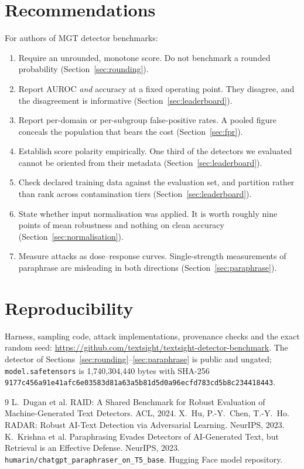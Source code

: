 \documentclass[11pt]{article}
\begin{document}
\section{Recommendations}

For authors of MGT detector benchmarks:
\begin{enumerate}\itemsep0pt
\item Require an unrounded, monotone score. Do not benchmark a rounded
probability (Section~\ref{sec:rounding}).
\item Report AUROC \emph{and} accuracy at a fixed operating point. They disagree,
and the disagreement is informative (Section~\ref{sec:leaderboard}).
\item Report per-domain or per-subgroup false-positive rates. A pooled figure
conceals the population that bears the cost (Section~\ref{sec:fpr}).
\item Establish score polarity empirically. One third of the detectors we
evaluated cannot be oriented from their metadata (Section~\ref{sec:leaderboard}).
\item Check declared training data against the evaluation set, and partition
rather than rank across contamination tiers (Section~\ref{sec:leaderboard}).
\item State whether input normalisation was applied. It is worth roughly nine
points of mean robustness and nothing on clean accuracy
(Section~\ref{sec:normalisation}).
\item Measure attacks as dose--response curves. Single-strength measurements of
paraphrase are misleading in both directions (Section~\ref{sec:paraphrase}).
\end{enumerate}

\section*{Reproducibility}

Harness, sampling code, attack implementations, provenance checks and the exact
random seed: \url{https://github.com/textsight/textsight-detector-benchmark}.
The detector of Sections~\ref{sec:rounding}--\ref{sec:paraphrase} is public and
ungated; \texttt{model.safetensors} is 1{,}740{,}304{,}440 bytes with SHA-256
\texttt{9177c456a91e41afc6e03583d81a63a5b81d5d0a96ecfd783cd5b8c234418443}.

\begin{thebibliography}{9}
 L.~Dugan et al. RAID: A Shared Benchmark for Robust Evaluation of
Machine-Generated Text Detectors. ACL, 2024.
 X.~Hu, P.-Y.~Chen, T.-Y.~Ho. RADAR: Robust AI-Text Detection via
Adversarial Learning. NeurIPS, 2023.
 K.~Krishna et al. Paraphrasing Evades Detectors of AI-Generated
Text, but Retrieval is an Effective Defense. NeurIPS, 2023.
 \texttt{humarin/chatgpt\_paraphraser\_on\_T5\_base}. Hugging
Face model repository.
\end{thebibliography}
\end{document}
